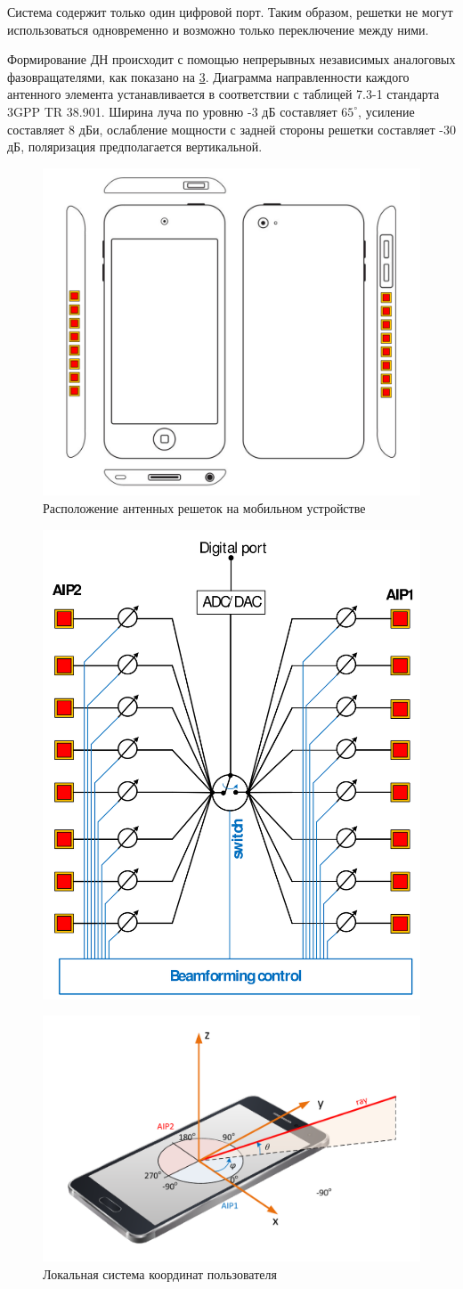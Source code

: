 Система содержит только один цифровой порт. Таким образом, решетки не могут
использоваться одновременно и возможно только переключение между ними.

Формирование ДН происходит с помощью непрерывных независимых аналоговых фазовращателями, как показано
на \ref{fig:4.4}.  Диаграмма направленности каждого антенного элемента устанавливается в
соответствии с таблицей 7.3-1 стандарта 3GPP TR 38.901. Ширина луча по уровню -3
дБ составляет $65^\circ$, усиление составляет 8 дБи, ослабление мощности с задней стороны решетки составляет
-30 дБ, поляризация предполагается вертикальной.

\begin{figure}[ht]
    \centering
    \includegraphics[width=0.5\linewidth]{figs/fig4.3}
    \caption{Расположение антенных решеток на мобильном устройстве}
    \label{fig:4.3}
\end{figure}


\begin{figure}[ht]
    \centering
    \includegraphics[width=0.4\linewidth]{figs/fig4.4}
    \caption{}
    \label{fig:4.4}
\end{figure}

\begin{figure}[ht]
    \centering
    \includegraphics[width=0.75\linewidth]{figs/fig4.5}
    \caption{Локальная система координат пользователя}
    \label{fig:4.4}
\end{figure}


